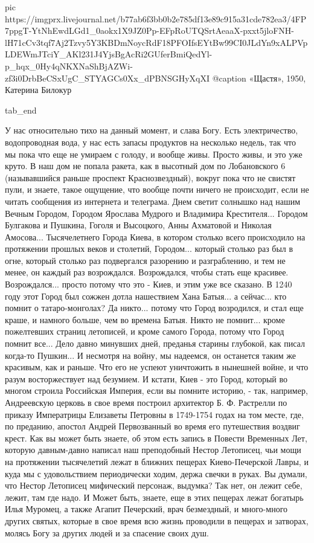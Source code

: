 		 pic https://imgprx.livejournal.net/b77ab6f3bb0b2e785df13e89c915a31cde782ea3/4FP7ppgT-YtNhEwdLGd1_0aokx1X9JZ0Pp-EFpRoUTQSrtAeaaX-pxxt5jloFNH-lH71cCv3tqf7Aj2Tzvy5Y3KBDmNoycRdF18PFOIfsEYtBw99CI0JLdYn9xALPVpLDEWmJTciY_AKl231J4YjsBgAcRi2GUferBmiQedYl-p_hqx_0Hy4qNKXNaShBjAZWi-zf3i0DrbBeCSxUgC_STYAGCs0Xx_dPBNSGHyXqXI
		 @caption «Щастя», 1950, Катерина Билокур

  tab_end
\fi

У нас относительно тихо на данный момент,
и слава Богу. Есть электричество, водопроводная вода, у нас есть запасы
продуктов на несколько недель, так что мы пока что еще не умираем с голоду, и
вообще живы. Просто живы, и это уже круто.  В наш дом не попала ракета, как в
высотный дом по Лобановского 6 (называвшийся раньше проспект Краснозвездный),
вокруг пока что не свистят пули, и знаете, такое ощущение, что вообще почти
ничего не происходит, если не читать сообщения из интернета и телеграма.  Днем
светит солнышко над нашим Вечным Городом, Городом Ярослава Мудрого и Владимира
Крестителя... Городом Булгакова и Пушкина, Гоголя и Высоцкого, Анны Ахматовой и
Николая Амосова...  Тысячелетнего Города Киева, в котором столько всего
происходило на протяжении прошлых веков и столетий, Городом... который столько раз был в
огне, который столько раз подвергался разорению и разграблению, и тем не менее,
он каждый раз возрождался. Возрождался, чтобы стать еще красивее. Возрождался... 
просто потому что это - Киев, и этим уже все сказано. В 1240 году
этот Город был сожжен дотла нашествием Хана Батыя... а сейчас... кто помнит о
татаро-монголах?  Да никто...  потому что Город возродился, и стал еще краше, и
намного больше, чем во времена Батыя.  Никто не помнит... кроме пожелтевших
страниц летописей, и кроме самого Города, потому что Город помнит все... Дело
давно минувших дней, преданья старины глубокой, как писал когда-то Пушкин... И
несмотря на войну, мы надеемся, он останется таким же красивым, как и раньше.
Что его не успеют уничтожить в нынешней войне, и что разум восторжествует над
безумием.  И кстати, Киев - это Город, который во многом строила Российская
Империя, если вы помните историю, - так, например, Андреевскую церковь в свое
время построил архитектор Б. Ф. Растрелли по приказу Императрицы Елизаветы
Петровны в 1749-1754 годах на том месте, где, по преданию, апостол Андрей
Первозванный во время его путешествия воздвиг крест. Как вы может быть знаете,
об этом есть запись в Повести Временных Лет, которую давным-давно написал наш
преподобный Нестор Летописец, чьи мощи на протяжении тысячелетий лежат в
ближних пещерах Киево-Печерской Лавры, и куда мы с удовольствием периодически
ходим, держа свечки в руках. Вы думали, что Нестор Летописец мифический
персонаж, выдумка? Так нет, он лежит себе, лежит, там где надо.  И Может быть,
знаете, еще в этих пещерах лежат богатырь Илья Муромец, а также Агапит
Печерский, врач безмездный, и много-много других святых, которые в свое время
всю жизнь проводили в пещерах и затворах, молясь Богу за других людей и за
спасение своих душ.

